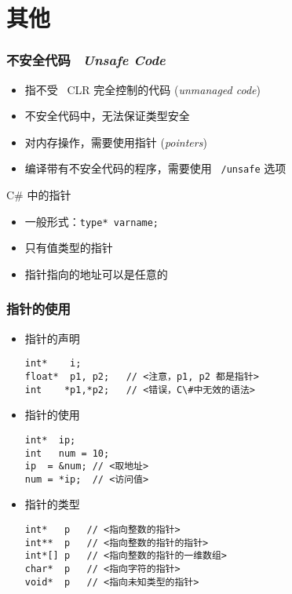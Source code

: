 
\section{其他}

\begin{frame}[fragile]
\frametitle{不安全代码 ~\textit{Unsafe Code}}

\begin{itemize}
\item 指不受 ~CLR 完全控制的代码 (\textit{unmanaged code})
\item 不安全代码中，无法保证类型安全
\item 对内存操作，需要使用指针 (\textit{pointers})
\item 编译带有不安全代码的程序，需要使用 ~\texttt{/unsafe} 选项
\end{itemize}

C\# 中的指针
\begin{itemize}
\item 一般形式：\texttt{type* varname;}
\item 只有值类型的指针
\item 指针指向的地址可以是任意的
\end{itemize}
\end{frame}

\begin{frame}[fragile]
\frametitle{指针的使用}
\begin{itemize}
\item 指针的声明
\begin{lstlisting}[escapeinside=<>]
int*    i;
float*  p1, p2;   // <注意，p1, p2 都是指针>
int    *p1,*p2;   // <错误，C\#中无效的语法>
\end{lstlisting}

\item 指针的使用
\begin{lstlisting}[escapeinside=<>]
int*  ip;
int   num = 10;
ip  = &num; // <取地址>
num = *ip;  // <访问值>
\end{lstlisting}

\item 指针的类型
\begin{lstlisting}[escapeinside=<>]
int*   p   // <指向整数的指针>
int**  p   // <指向整数的指针的指针>
int*[] p   // <指向整数的指针的一维数组>
char*  p   // <指向字符的指针>
void*  p   // <指向未知类型的指针>
\end{lstlisting}
\end{itemize}
\end{frame}


